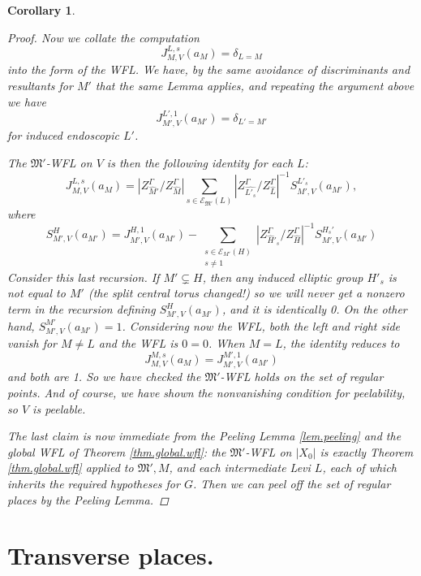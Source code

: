 \documentclass[openany]{amsbook}
\newtheorem{corollary}[theorem]{Corollary}
\theoremstyle{definition}
\theoremstyle{remark}
\numberwithin{equation}{section}
\newcommand{\cE}{\mathcal{E}}
\renewcommand{\-}{\operatorname{-}}
\newcommand{\fM}{\mathfrak{M}}
\begin{document}
\begin{corollary}
\begin{proof}
        Now we collate the computation $$J_{M,V}^{L,s}(a_M) =\delta_{L = M}$$ into the form of the WFL. We have, by the same avoidance of discriminants and resultants for $M'$ that the same Lemma applies, and repeating the argument above we have
        $$
            J_{M',V}^{L', 1}(a_{M'}) = \delta_{L' = M'}
        $$
        for induced endoscopic $L'$. 

        The $\fM'$-WFL on $V$ is then the following identity for each $L$:
        $$
            J_{M,V}^{L,s}(a_M) = |Z^\Gamma_{\widehat{M}'}/ Z_{\widehat{M}}^\Gamma| \sum_{s \in \cE_{\fM'}(L)} |Z_{\widehat{L'_s}}^\Gamma/ Z_{\widehat{L}}^\Gamma |^{-1} S_{M',V}^{L'_s}(a_{M'}),
        $$
        where 
        $$
            S_{M',V}^H(a_{M'}) = J_{M',V}^{H,1}(a_{M'}) - \sum_{\substack{s \in \cE_{M'}(H) \\ s \neq 1}} | Z_{\widehat{H}'_s}^\Gamma/Z_{\widehat{H}}^\Gamma|^{-1} S_{M', V}^{H_s'}(a_{M'})
        $$
        Consider this last recursion. If $M' \subsetneq H$, then any induced elliptic group $H'_s$ is not equal to $M'$ (the split central torus changed!) so we will never get a nonzero term in the recursion defining $S_{M',V}^H(a_{M'})$, and it is identically 0. On the other hand, $S_{M',V}^{M'}(a_{M'}) = 1$. Considering now the WFL, both the left and right side vanish for $M \neq L$ and the WFL is $0 = 0$. When $M = L$, the identity reduces to
        $$
            J_{M,V}^{M,s}(a_M) = J_{M',V}^{M',1}(a_{M'})
        $$
        and both are 1. So we have checked the $\fM'$-WFL holds on the set of regular points. And of course, we have shown the nonvanishing condition for peelability, so $V$ is peelable.

        The last claim is now immediate from the Peeling Lemma \ref{lem.peeling} and the global WFL of Theorem \ref{thm.global.wfl}: the $\fM'$-WFL on $|X_0|$ is exactly Theorem \ref{thm.global.wfl} applied to $\fM', M$, and each intermediate Levi $L$, each of which inherits the required hypotheses for $G$. Then we can peel off the set of regular places by the Peeling Lemma. 
    \end{proof}
\end{corollary}

        

\section{Transverse places.}\label{subsect.transverse.places}
\end{document}
